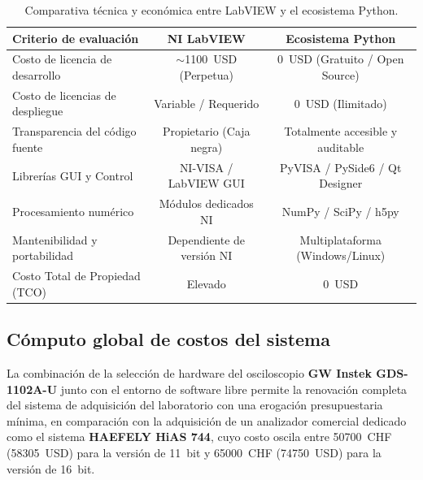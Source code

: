 \begin{table}[H]
\centering
\begin{small}
\caption{Comparativa técnica y económica entre LabVIEW y el ecosistema Python.}
\label{tab:comparativa_software_costos}
\begin{tabular}{lcc}
\toprule
\textbf{Criterio de evaluación} & \textbf{NI LabVIEW} & \textbf{Ecosistema Python} \\ \midrule
Costo de licencia de desarrollo & $\sim$\qty{1100}{USD} (Perpetua) & \qty{0}{USD} (Gratuito / Open Source) \\ \midrule
Costo de licencias de despliegue & Variable / Requerido & \qty{0}{USD} (Ilimitado) \\ \midrule
Transparencia del código fuente & Propietario (Caja negra) & Totalmente accesible y auditable \\ \midrule
Librerías GUI y Control & NI-VISA / LabVIEW GUI & PyVISA \cite{gds1000au_driver} / PySide6 / Qt Designer \\ \midrule
Procesamiento numérico & Módulos dedicados NI & NumPy / SciPy / h5py \\ \midrule
Mantenibilidad y portabilidad & Dependiente de versión NI & Multiplataforma (Windows/Linux) \\ \midrule
Costo Total de Propiedad (TCO) & Elevado & \qty{0}{USD} \\ \bottomrule
\end{tabular}
\end{small}
\end{table}

\subsection{Cómputo global de costos del sistema} \label{subsec:computo_global}

La combinación de la selección de hardware del osciloscopio \textbf{GW Instek GDS-1102A-U} junto con el entorno de software libre permite la renovación completa del sistema de adquisición del laboratorio con una erogación presupuestaria mínima, en comparación con la adquisición de un analizador comercial dedicado como el sistema \textbf{HAEFELY HiAS 744}, cuyo costo oscila entre \qty{50700}{CHF} (\qty{58305}{USD}) para la versión de \qty{11}{bit} y \qty{65000}{CHF} (\qty{74750}{USD}) para la versión de \qty{16}{bit}.